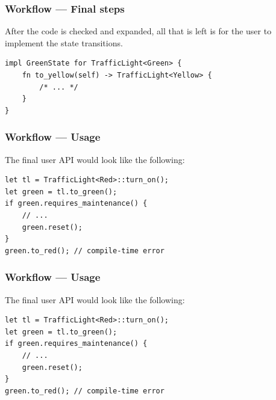 \documentclass[bigger,notes,aspectratio=169]{beamer}
\begin{document}
\begin{frame}[fragile]
    \frametitle{Workflow --- Final steps}
    After the code is checked and expanded, all that is left is for the user to implement the state transitions.
    \begin{listing}
        \centering
        \begin{verbatim}
impl GreenState for TrafficLight<Green> {
    fn to_yellow(self) -> TrafficLight<Yellow> {
        /* ... */
    }
}
        \end{verbatim}
    \end{listing}

\end{frame}

\begin{frame}[fragile]
    \frametitle{Workflow --- Usage}
    The final user API would look like the following:
    \begin{listing}
        \centering
        \begin{verbatim}
let tl = TrafficLight<Red>::turn_on();
let green = tl.to_green();
if green.requires_maintenance() {
    // ...
    green.reset();
}
green.to_red(); // compile-time error
        \end{verbatim}
    \end{listing}

\end{frame}

\begin{frame}[fragile]
    \frametitle{Workflow --- Usage}
    The final user API would look like the following:
    \begin{listing}
        \centering
        \begin{verbatim}
let tl = TrafficLight<Red>::turn_on();
let green = tl.to_green();
if green.requires_maintenance() {
    // ...
    green.reset();
}
green.to_red(); // compile-time error
        \end{verbatim}
    \end{listing}

\end{frame}
\end{document}
